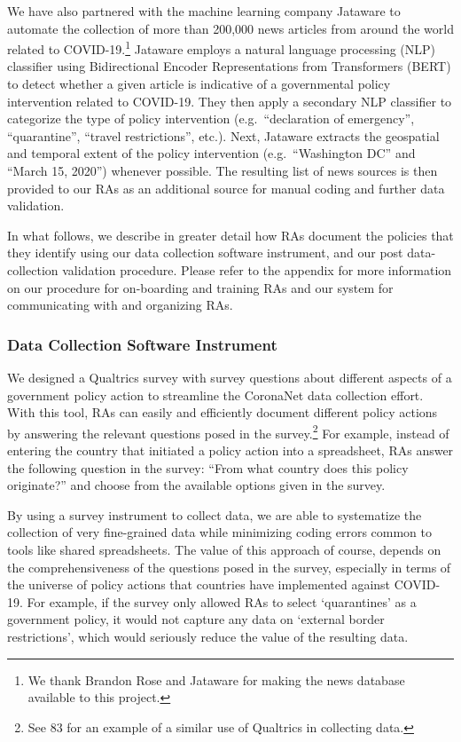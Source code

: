 \documentclass[]{article}
\let\rmarkdownfootnote\footnote%
\def\footnote{\protect\rmarkdownfootnote}
\begin{document}
We have also partnered with the machine learning company Jataware to automate the collection of more than 200,000 news articles from around the world related to COVID-19.\footnote{We thank Brandon Rose and Jataware for making the news database available to this project.} Jataware employs a natural language processing (NLP) classifier using Bidirectional Encoder Representations from Transformers (BERT) to detect whether a given article is indicative of a governmental policy intervention related to COVID-19. They then apply a secondary NLP classifier to categorize the type of policy intervention (e.g.~``declaration of emergency'', ``quarantine'', ``travel restrictions'', etc.). Next, Jataware extracts the geospatial and temporal extent of the policy intervention (e.g.~``Washington DC'' and ``March 15, 2020'') whenever possible. The resulting list of news sources is then provided to our RAs as an additional source for manual coding and further data validation.

In what follows, we describe in greater detail how RAs document the policies that they identify using our data collection software instrument, and our post data-collection validation procedure. Please refer to the appendix for more information on our procedure for on-boarding and training RAs and our system for communicating with and organizing RAs.

\hypertarget{data-collection-software-instrument}{%
\subsubsection*{Data Collection Software Instrument}\label{data-collection-software-instrument}}

We designed a Qualtrics survey with survey questions about different aspects of a government policy action to streamline the CoronaNet data collection effort. With this tool, RAs can easily and efficiently document different policy actions by answering the relevant questions posed in the survey.\footnote{See 83 for an example of a similar use of Qualtrics in collecting data.} For example, instead of entering the country that initiated a policy action into a spreadsheet, RAs answer the following question in the survey: ``From what country does this policy originate?'' and choose from the available options given in the survey.

By using a survey instrument to collect data, we are able to systematize the collection of very fine-grained data while minimizing coding errors common to tools like shared spreadsheets. The value of this approach of course, depends on the comprehensiveness of the questions posed in the survey, especially in terms of the universe of policy actions that countries have implemented against COVID-19. For example, if the survey only allowed RAs to select `quarantines' as a government policy, it would not capture any data on `external border restrictions', which would seriously reduce the value of the resulting data.
\end{document}
